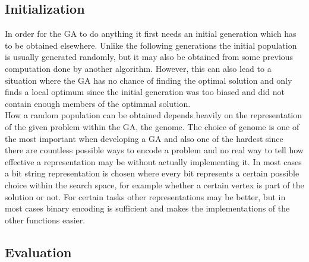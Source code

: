 \subsection{Initialization}
\label{sec:initialization}

In order for the GA to do anything it first needs an initial generation which has to be obtained elsewhere. Unlike the following generations the initial population is usually generated randomly, but it may also be obtained from some previous computation done by another algorithm. However, this can also lead to a situation where the GA has no chance of finding the optimal solution and only finds a local optimum since the initial generation was too biased and did not contain enough members of the optimmal solution. \\
How a random population can be obtained depends heavily on the representation of the given problem within the GA, the genome. The choice of genome is one of the most important when developing a GA and also one of the hardest since there are countless possible ways to encode a problem and no real way to tell how effective a representation may be without actually implementing it. In most cases a bit string representation is chosen where every bit represents a certain possible choice within the search space, for example whether a certain vertex is part of the solution or not. For certain tasks other representations may be better, but in most cases binary encoding is sufficient and makes the implementations of the other functions easier.

\subsection{Evaluation}
\label{sec:evaluation}

